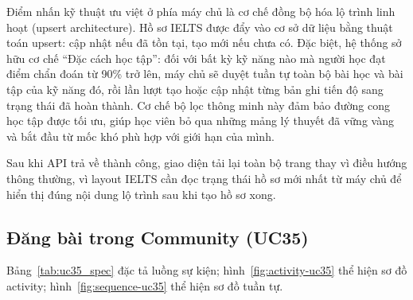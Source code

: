 \begin{sloppypar}
Điểm nhấn kỹ thuật ưu việt ở phía máy chủ là cơ chế đồng bộ hóa lộ trình linh hoạt (upsert architecture). Hồ sơ IELTS được đẩy vào cơ sở dữ liệu bằng thuật toán upsert: cập nhật nếu đã tồn tại, tạo mới nếu chưa có. Đặc biệt, hệ thống sở hữu cơ chế ``Đặc cách học tập'': đối với bất kỳ kỹ năng nào mà người học đạt điểm chẩn đoán từ 90\% trở lên, máy chủ sẽ duyệt tuần tự toàn bộ bài học và bài tập của kỹ năng đó, rồi lần lượt tạo hoặc cập nhật từng bản ghi tiến độ sang trạng thái đã hoàn thành. Cơ chế bộ lọc thông minh này đảm bảo đường cong học tập được tối ưu, giúp học viên bỏ qua những mảng lý thuyết đã vững vàng và bắt đầu từ mốc khó phù hợp với giới hạn của mình.
\end{sloppypar}

Sau khi API trả về thành công, giao diện tải lại toàn bộ trang thay vì điều hướng thông thường, vì layout IELTS cần đọc trạng thái hồ sơ mới nhất từ máy chủ để hiển thị đúng nội dung lộ trình sau khi tạo hồ sơ xong.

\subsection{Đăng bài trong Community (UC35)}
Bảng~\ref{tab:uc35_spec} đặc tả luồng sự kiện; hình~\ref{fig:activity-uc35} thể hiện sơ đồ activity; hình~\ref{fig:sequence-uc35} thể hiện sơ đồ tuần tự.
